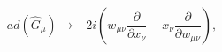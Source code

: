 \begin{equation}
ad\left(\hat{G}_{\mu} \right)\rightarrow -2i\left(
w_{\mu\nu}\frac{\partial}{\partial x_{\nu}}
- x_{\nu}\frac{\partial}{\partial w_{\mu\nu}}
\right), 
\end{equation}

